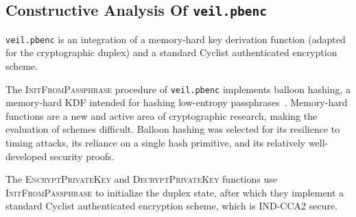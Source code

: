 \subsection{Constructive Analysis Of \texttt{veil.pbenc}}\label{subsec:veil.pbenc-analysis}

\texttt{veil.pbenc} is an integration of a memory-hard key derivation function (adapted for the cryptographic duplex)
and a standard Cyclist authenticated encryption scheme.

The \textsc{InitFromPassphrase} procedure of \texttt{veil.pbenc} implements balloon hashing, a memory-hard KDF intended
for hashing low-entropy passphrases~\cite{boneh2016}.
Memory-hard functions are a new and active area of cryptographic research, making the evaluation of schemes difficult.
Balloon hashing was selected for its resilience to timing attacks, its reliance on a single hash primitive, and its
relatively well-developed security proofs.

The \textsc{EncryptPrivateKey} and \textsc{DecryptPrivateKey} functions use \textsc{InitFromPassphrase} to initialize
the duplex state, after which they implement a standard Cyclist authenticated encryption scheme, which is IND-CCA2
secure.
